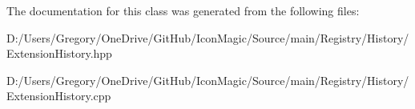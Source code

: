 The documentation for this class was generated from the following files\+:\begin{DoxyCompactItemize}
\item 
D\+:/\+Users/\+Gregory/\+One\+Drive/\+Git\+Hub/\+Icon\+Magic/\+Source/main/\+Registry/\+History/Extension\+History.\+hpp\item 
D\+:/\+Users/\+Gregory/\+One\+Drive/\+Git\+Hub/\+Icon\+Magic/\+Source/main/\+Registry/\+History/Extension\+History.\+cpp\end{DoxyCompactItemize}

